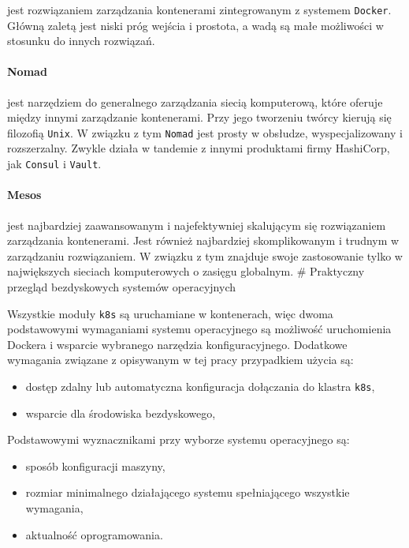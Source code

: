 \documentclass[a4paper,12pt,twoside,openany]{report}
\providecommand{\tightlist}{%
  \setlength{\itemsep}{0pt}\setlength{\parskip}{0pt}}
\newcommand{\passthrough}[1]{#1}
\begin{document}
jest rozwiązaniem zarządzania kontenerami zintegrowanym z systemem
\passthrough{\lstinline!Docker!}. Główną zaletą jest niski próg wejścia
i prostota, a wadą są małe możliwości w stosunku do innych rozwiązań.

\hypertarget{nomad}{%
\paragraph{Nomad}\label{nomad}}

jest narzędziem do generalnego zarządzania siecią komputerową, które
oferuje między innymi zarządzanie kontenerami. Przy jego tworzeniu
twórcy kierują się filozofią \passthrough{\lstinline!Unix!}. W związku z
tym \passthrough{\lstinline!Nomad!} jest prosty w obsłudze,
wyspecjalizowany i rozszerzalny. Zwykle działa w tandemie z innymi
produktami firmy HashiCorp, jak \passthrough{\lstinline!Consul!} i
\passthrough{\lstinline!Vault!}.

\hypertarget{mesos}{%
\paragraph{Mesos}\label{mesos}}

jest najbardziej zaawansowanym i najefektywniej skalującym się
rozwiązaniem zarządzania kontenerami. Jest również najbardziej
skomplikowanym i trudnym w zarządzaniu rozwiązaniem. W związku z tym
znajduje swoje zastosowanie tylko w największych sieciach komputerowych
o zasięgu globalnym. \# Praktyczny przegląd bezdyskowych systemów
operacyjnych

Wszystkie moduły \passthrough{\lstinline!k8s!} są uruchamiane w
kontenerach, więc dwoma podstawowymi wymaganiami systemu operacyjnego są
możliwość uruchomienia Dockera i wsparcie wybranego narzędzia
konfiguracyjnego. Dodatkowe wymagania związane z opisywanym w tej pracy
przypadkiem użycia są:

\begin{itemize}
\tightlist
\item
  dostęp zdalny lub automatyczna konfiguracja dołączania do klastra
  \passthrough{\lstinline!k8s!},
\item
  wsparcie dla środowiska bezdyskowego,
\end{itemize}

Podstawowymi wyznacznikami przy wyborze systemu operacyjnego są:

\begin{itemize}
\tightlist
\item
  sposób konfiguracji maszyny,
\item
  rozmiar minimalnego działającego systemu spełniającego wszystkie
  wymagania,
\item
  aktualność oprogramowania.
\end{itemize}
\end{document}
